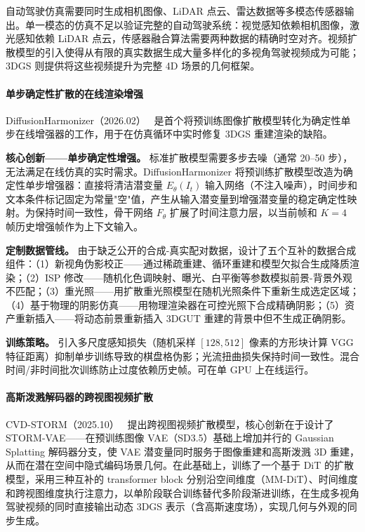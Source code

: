 自动驾驶仿真需要同时生成相机图像、LiDAR 点云、雷达数据等多模态传感器输出。单一模态的仿真不足以验证完整的自动驾驶系统：视觉感知依赖相机图像，激光感知依赖 LiDAR 点云，传感器融合算法需要两种数据的精确时空对齐。视频扩散模型的引入使得从有限的真实数据生成大量多样化的多视角驾驶视频成为可能；3DGS 则提供将这些视频提升为完整 4D 场景的几何框架。

\paragraph{单步确定性扩散的在线渲染增强}

DiffusionHarmonizer（2026.02）~\cite{2602_24096} 是首个将预训练图像扩散模型转化为确定性单步在线增强器的工作，用于在仿真循环中实时修复 3DGS 重建渲染的缺陷。

\textbf{核心创新——单步确定性增强。} 标准扩散模型需要多步去噪（通常 20--50 步），无法满足在线仿真的实时需求。DiffusionHarmonizer 将预训练扩散模型改造为确定性单步增强器：直接将清洁潜变量 $E_\theta(I_t)$ 输入网络（不注入噪声），时间步和文本条件标记固定为常量"空"值，产生从输入潜变量到增强潜变量的稳定确定性映射。为保持时间一致性，骨干网络 $F_\theta$ 扩展了时间注意力层，以当前帧和 $K=4$ 帧历史增强帧作为上下文输入。

\textbf{定制数据管线。} 由于缺乏公开的合成-真实配对数据，设计了五个互补的数据合成组件：（1）新视角伪影校正——通过稀疏重建、循环重建和模型欠拟合生成降质渲染；（2）ISP 修改——随机化色调映射、曝光、白平衡等参数模拟前景-背景外观不匹配；（3）重光照——用扩散重光照模型在随机光照条件下重新生成选定区域；（4）基于物理的阴影仿真——用物理渲染器在可控光照下合成精确阴影；（5）资产重新插入——将动态前景重新插入 3DGUT 重建的背景中但不生成正确阴影。

\textbf{训练策略。} 引入多尺度感知损失（随机采样 $[128, 512]$ 像素的方形块计算 VGG 特征距离）抑制单步训练导致的棋盘格伪影；光流扭曲损失保持时间一致性。混合时间/非时间批次训练防止过度依赖历史帧。可在单 GPU 上在线运行。

\paragraph{高斯泼溅解码器的跨视图视频扩散}

CVD-STORM（2025.10）~\cite{2510_07944} 提出跨视图视频扩散模型，核心创新在于设计了 STORM-VAE——在预训练图像 VAE（SD3.5）基础上增加并行的 Gaussian Splatting 解码器分支，使 VAE 潜变量同时服务于图像重建和高斯泼溅 3D 重建，从而在潜在空间中隐式编码场景几何。在此基础上，训练了一个基于 DiT 的扩散模型，采用三种互补的 transformer block 分别沿空间维度（MM-DiT）、时间维度和跨视图维度执行注意力，以单阶段联合训练替代多阶段渐进训练，在生成多视角驾驶视频的同时直接输出动态 3DGS 表示（含高斯速度场），实现几何与外观的同步生成。

